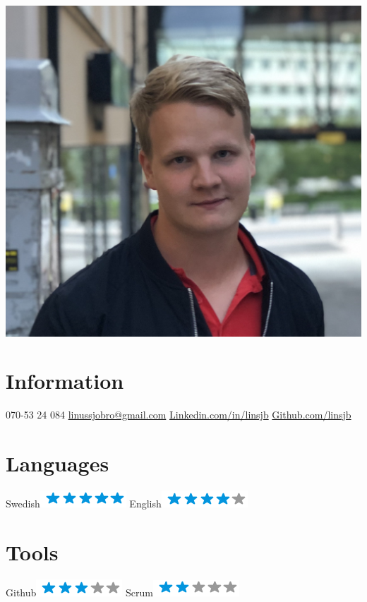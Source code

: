 \begin{aside}
    \includegraphics[width=1.0\textwidth]{img/me.png}
    \section{Information}
      070-53 24 084
      \href{mailto:linussjobro@gmail.com}{linussjobro@gmail.com}
      \href{https://www.linkedin.com/in/linsjb}{Linkedin.com/in/linsjb}
      \href{https://github.com/linsjb}{Github.com/linsjb}
    \section{Languages}
      Swedish\includegraphics[scale=0.40]{img/5stars.png}
      English\includegraphics[scale=0.40]{img/4stars.png}
    \section{Tools}
      Github\includegraphics[scale=0.40]{img/3stars.png}
      Scrum\includegraphics[scale=0.40]{img/2stars.png}

\end{aside}
